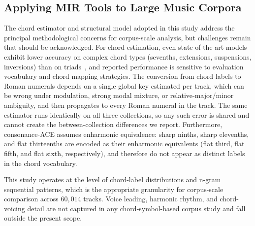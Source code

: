 \documentclass{article}
\begin{document}

\subsection{Applying MIR Tools to Large Music Corpora}
\label{sec:disc_mir}

The chord estimator and structural model adopted in this study
address the principal methodological concerns for corpus-scale analysis, but challenges remain that should be acknowledged. For chord estimation, even state-of-the-art models exhibit lower accuracy on complex chord types (sevenths, extensions, suspensions, inversions) than on triads~\citep{pauwels2013evaluating, poltronieri2025discord}, and reported performance is sensitive to evaluation vocabulary and chord mapping strategies. The conversion from chord labels to Roman numerals depends on a single global key estimated per track, which can be wrong under modulation, strong modal mixture, or relative-major/minor ambiguity, and then propagates to every Roman numeral in the track. The same estimator runs identically on all three collections, so any such error is shared and cannot create the between-collection differences we report. Furthermore, consonance-ACE assumes enharmonic equivalence: sharp ninths, sharp elevenths, and flat thirteenths are encoded as their enharmonic equivalents (flat third, flat fifth, and flat sixth, respectively), and therefore do not appear as distinct labels in the chord vocabulary.

This study operates at the level of chord-label distributions and n-gram sequential patterns, which is the appropriate granularity for corpus-scale comparison across $60,014$ tracks. Voice leading, harmonic rhythm, and chord-voicing detail are not captured in any chord-symbol-based corpus study and fall outside the present scope.
\end{document}
